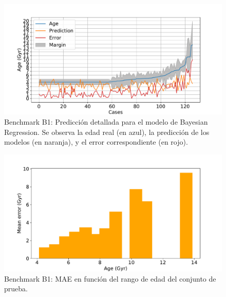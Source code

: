 \begin{figure}[H]
\begin{center}
 \includegraphics[width=0.8\linewidth]{Figuras/Experimentos/B_B1_bayes_2.pdf}
\end{center}
\caption{Benchmark B1: Predicción detallada para el modelo de Bayesian Regression. Se observa la edad real (en azul), la predicción de los modelos (en naranja), y el error correspondiente (en rojo).}
 \label{fig:benchB1_details_bayes_2}
\end{figure}

\begin{figure}[H]
\begin{center}
 \includegraphics[width=0.8\linewidth]{Figuras/Experimentos/B_B1_bayes_3.pdf}
\end{center}
\caption{Benchmark B1: MAE en función del rango de edad del conjunto de prueba.}
 \label{fig:benchB1_details_bayes_3}
\end{figure}


